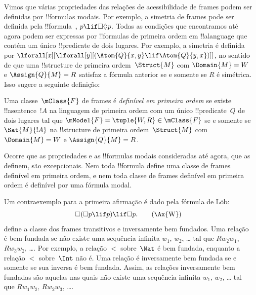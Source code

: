 \documentclass[../../../include/open-logic-section]{subfiles}
\begin{document}


Vimos que várias propriedades das relações de acessibilidade de frames podem
ser definidas por !!{formula}s modais. Por exemplo, a simetria de frames pode
ser definida pela !!{formula}~, $p \lif \Box\Diamond p$. Todas as
condições que encontramos até agora podem ser expressas por !!{formula}s de
primeira ordem em !!a{language} que contém um único !!{predicate} de dois
lugares. Por exemplo, a simetria é definida por
$\lforall[x][\lforall[y][(\Atom{Q}{x,y} \lif \Atom{Q}{y, x})]]$, no sentido de
que uma !!{structure} de primeira ordem~$\Struct{M}$ com $\Domain{M} = W$ e
$\Assign{Q}{M} = R$ satisfaz a fórmula anterior se e somente se $R$ é
simétrica. Isso sugere a seguinte definição:

\begin{defn}
  Uma classe~$\mClass{F}$ de frames é \emph{definível em primeira ordem} se
  existe !!a{sentence}~$!A$ na linguagem de primeira ordem com um único
  !!{predicate}~$Q$ de dois lugares tal que
  $\mModel{F} = \tuple{W, R} \in \mClass{F}$ se e somente se
  $\Sat{M}{!A}$ na !!{structure} de primeira ordem~$\Struct{M}$ com
  $\Domain{M} = W$ e $\Assign{Q}{M} = R$.
\end{defn}

Ocorre que as propriedades e as !!{formula}s modais consideradas até agora,
que as definem, são excepcionais. Nem toda !!{formula} define uma classe de
frames definível em primeira ordem, e nem toda classe de frames definível em
primeira ordem é definível por uma fórmula modal.

Um contraexemplo para a primeira afirmação é dado pela fórmula de L\"ob:
\begin{equation}
\Box(\Box p \lif p) \lif \Box p. \tag{\Ax{W}}
\end{equation}
 define a classe dos frames transitivos e inversamente bem fundados.
Uma relação é bem fundada se não existe uma sequência infinita $w_1$, $w_2$,
\dots{} tal que $Rw_2w_1$, $Rw_3w_2$, \dots. Por exemplo, a relação $<$
sobre~$\Nat$ é bem fundada, enquanto a relação $<$ sobre~$\Int$ não é. Uma
relação é inversamente bem fundada se e somente se sua inversa é bem fundada.
Assim, as relações inversamente bem fundadas são aquelas nas quais não existe
uma sequência infinita $w_1$, $w_2$, \dots{} tal que $Rw_1w_2$, $Rw_2w_3$,
\dots.
\end{document}
